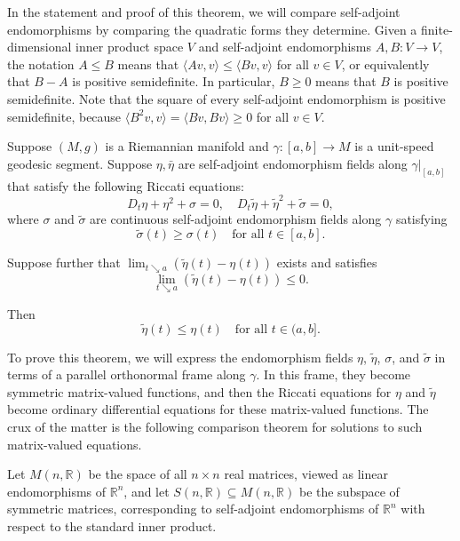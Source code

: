In the statement and proof of this theorem, we will compare self-adjoint endomorphisms by comparing the quadratic forms they determine. Given a finite-dimensional inner product space $V$ and self-adjoint endomorphisms $A, B : V \to V$, the notation $A \le B$ means that $\langle Av, v \rangle \le \langle Bv, v \rangle$ for all $v \in V$, or equivalently that $B - A$ is positive semidefinite. In particular, $B \ge 0$ means that $B$ is positive semidefinite. Note that the square of every self-adjoint endomorphism is positive semidefinite, because $\langle B^2 v, v \rangle = \langle Bv, Bv \rangle \ge 0$ for all $v \in V$.

\begin{theorem}
\label{thm:riccati-comparison-theorem}
Suppose $(M,g)$ is a Riemannian manifold and $\gamma : [a,b] \to M$ is a unit-speed geodesic segment. Suppose $\eta, \bar{\eta}$ are self-adjoint endomorphism fields along $\gamma|_{[a,b]}$ that satisfy the following Riccati equations:
\begin{equation}
D_t \eta + \eta^2 + \sigma = 0, \quad D_t \tilde{\eta} + \tilde{\eta}^2 + \tilde{\sigma} = 0,
\tag{11.8}
\end{equation}
where $\sigma$ and $\tilde{\sigma}$ are continuous self-adjoint endomorphism fields along $\gamma$ satisfying
\begin{equation}
\tilde{\sigma}(t) \ge \sigma(t) \quad \text{for all } t \in [a, b].
\tag{11.9}
\end{equation}

Suppose further that $\lim_{t \searrow a} (\tilde{\eta}(t) - \eta(t))$ exists and satisfies
\[
\lim_{t \searrow a} (\tilde{\eta}(t) - \eta(t)) \le 0.
\]

Then
\[
\tilde{\eta}(t) \le \eta(t) \quad \text{for all } t \in (a, b].
\]
\end{theorem}

To prove this theorem, we will express the endomorphism fields $\eta$, $\tilde{\eta}$, $\sigma$, and $\tilde{\sigma}$ in terms of a parallel orthonormal frame along $\gamma$. In this frame, they become symmetric matrix-valued functions, and then the Riccati equations for $\eta$ and $\tilde{\eta}$ become ordinary differential equations for these matrix-valued functions. The crux of the matter is the following comparison theorem for solutions to such matrix-valued equations.

Let $M(n, \mathbb{R})$ be the space of all $n \times n$ real matrices, viewed as linear endomorphisms of $\mathbb{R}^n$, and let $S(n, \mathbb{R}) \subseteq M(n, \mathbb{R})$ be the subspace of symmetric matrices, corresponding to self-adjoint endomorphisms of $\mathbb{R}^n$ with respect to the standard inner product.

